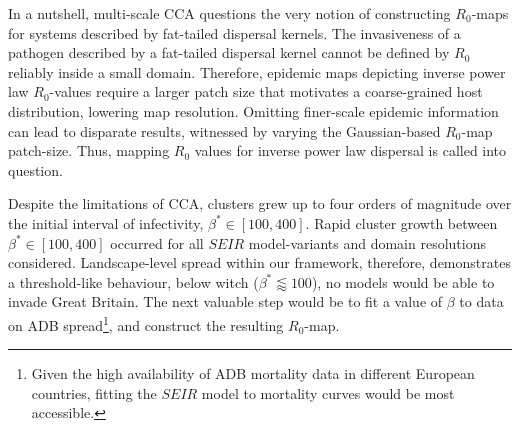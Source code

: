 In a nutshell, multi-scale CCA questions the very notion of constructing $R_0$-maps for systems described by fat-tailed dispersal kernels.
The invasiveness of a pathogen described by a fat-tailed dispersal kernel cannot be defined by $R_0$ reliably inside a small domain.
Therefore, epidemic maps depicting inverse power law $R_0$-values require a larger patch size that motivates a coarse-grained host distribution, lowering map resolution.
Omitting finer-scale epidemic information can lead to disparate results, witnessed by varying the Gaussian-based $R_0$-map patch-size.
Thus, mapping $R_0$ values for inverse power law dispersal is called into question.

Despite the limitations of CCA, clusters grew up to four orders of magnitude over the initial interval of infectivity, $\beta^*\in [100, 400]$.
Rapid cluster growth between $\beta^*\in [100, 400]$ occurred for all $SEIR$ model-variants and domain resolutions considered.
Landscape-level spread within our framework, therefore, demonstrates a threshold-like behaviour, below witch ($\beta^* \lessapprox 100$), no models would be able to invade Great Britain.
The next valuable step would be to fit a value of $\beta$ to data on ADB spread\footnote{Given the high availability of ADB mortality data in different European countries, fitting the $SEIR$ model to mortality curves would be most accessible.}, 
and construct the resulting $R_0$-map.




